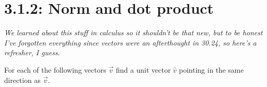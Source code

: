 \documentclass{article}
\begin{document}
\section*{3.1.2: Norm and dot product}
\textit{We learned about this stuff in calculus so it shouldn't be that new, but to be honest I've forgotten everything since vectors were an afterthought in 30.24, so here's a refresher, I guess.}
\begin{center}
    \colorbox{CornflowerBlue!50}{
    \begin{minipage}[c]{0.9\textwidth}
        \centering
        For each of the following vectors \(\overrightarrow{v}\) find a unit vector \(\hat{v}\) pointing in the same direction as \(\overrightarrow{v}\). 
    \end{minipage}
    }
\end{center}
\end{document}

